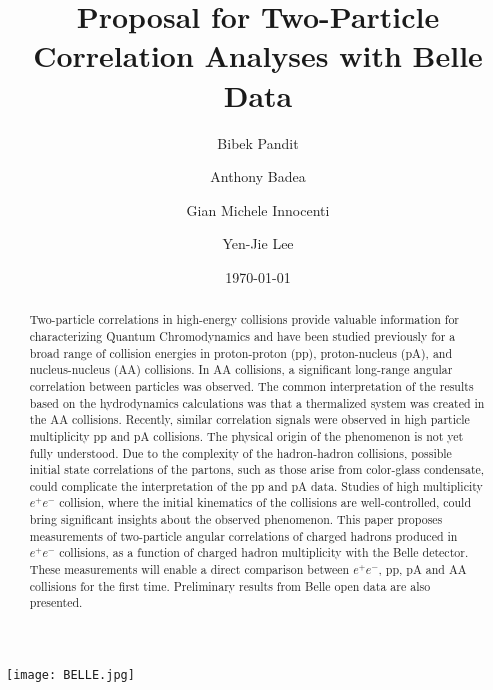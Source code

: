 \documentclass[%
preprint,
bibnotes,
]{revtex4-1}
\begin{document}
\texttt{[image: BELLE.jpg]}
\title{Proposal for Two-Particle Correlation Analyses with Belle Data}%

\author{Bibek Pandit}%
\author{Anthony Badea}%
\author{Gian Michele Innocenti}%
\author{Yen-Jie Lee}


\date{\today}%

\begin{abstract}
Two-particle correlations in high-energy collisions provide valuable information for characterizing Quantum Chromodynamics and have been studied previously for a broad range of collision energies in proton-proton (pp), proton-nucleus (pA), and nucleus-nucleus (AA) collisions. In AA collisions, a significant long-range angular correlation between particles was observed. The common interpretation of the results based on the hydrodynamics calculations was that a thermalized system was created in the AA collisions. Recently, similar correlation signals were observed in high particle multiplicity pp and pA collisions. The physical origin of the phenomenon is not yet fully understood. Due to the complexity of the hadron-hadron collisions, possible initial state correlations of the partons, such as those arise from color-glass condensate, could complicate the interpretation of the pp and pA data. Studies of high multiplicity $e^+e^-$ collision, where the initial kinematics of the collisions are well-controlled, could bring significant insights about the observed phenomenon. This paper proposes measurements of two-particle angular correlations of charged hadrons produced in $e^+e^-$ collisions, as a function of charged hadron multiplicity with the Belle detector. These measurements will enable a direct comparison between $e^+e^-$, pp, pA and AA collisions for the first time. Preliminary results from Belle open data are also presented.
\end{abstract}
\end{document}
